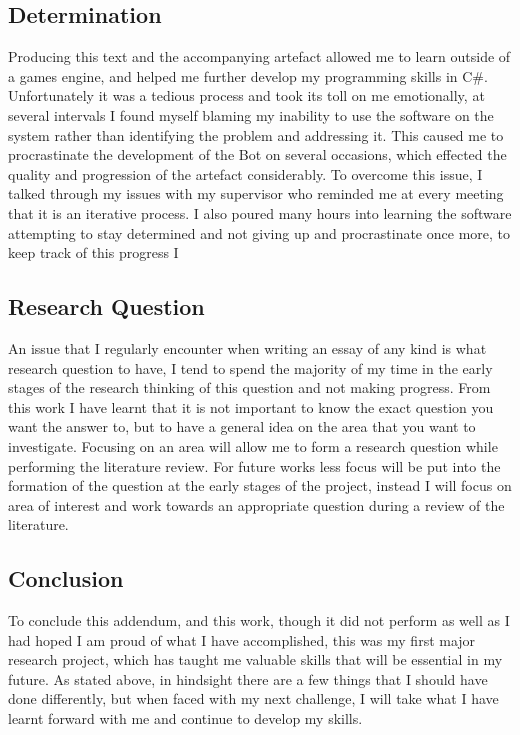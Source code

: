 \documentclass[journal]{IEEEtran}
\begin{document}
	\subsection{Determination}
	Producing this text and the accompanying artefact allowed me to learn outside of a games engine, and helped me further develop my programming skills in C\#. Unfortunately it was a tedious process and took its toll on me emotionally, at several intervals I found myself blaming my inability to use the software on the system rather than identifying the problem and addressing it. This caused me to procrastinate the development of the Bot on several occasions, which effected the quality and progression of the artefact considerably. To overcome this issue, I talked through my issues with my supervisor who reminded me at every meeting that it is an iterative process. I also poured many hours into learning the software attempting to stay determined and not giving up and procrastinate once more, to keep track of this progress I 
	
	\subsection{Research Question}
	An issue that I regularly encounter when writing an essay of any kind is what research question to have, I tend to spend the majority of my time in the early stages of the research thinking of this question and not making progress. From this work I have learnt that it is not important to know the exact question you want the answer to, but to have a general idea on the area that you want to investigate. Focusing on an area will allow me to form a research question while performing the literature review. For future works less focus will be put into the formation of the question at the early stages of the project, instead I will focus on area of interest and work towards an appropriate question during a review of the literature.
	
	\subsection{Conclusion}
	To conclude this addendum, and this work, though it did not perform as well as I had hoped I am proud of what I have accomplished, this was my first major research project, which has taught me valuable skills that will be essential in my future. As stated above, in hindsight there are a few things that I should have done differently, but when faced with my next challenge, I will take what I have learnt forward with me and continue to develop my skills.
\end{document}
